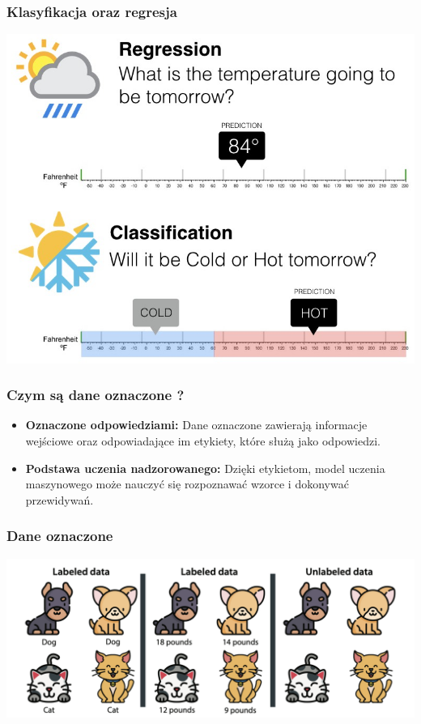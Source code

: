\documentclass[smaller]{beamer}
\begin{document}

\begin{frame}
\frametitle{Klasyfikacja oraz regresja}
\includegraphics[width=\textwidth,height=0.8\textheight,keepaspectratio]{../manifest/regression-classification-2.png}
\end{frame}


\begin{frame}
\frametitle{Czym są dane oznaczone ?}

\begin{itemize}
    \item \textbf{Oznaczone odpowiedziami:} Dane oznaczone zawierają informacje wejściowe oraz odpowiadające im etykiety, które służą jako odpowiedzi.
    \item \textbf{Podstawa uczenia nadzorowanego:} Dzięki etykietom, model uczenia maszynowego może nauczyć się rozpoznawać wzorce i dokonywać przewidywań.
\end{itemize}

\end{frame}


\begin{frame}
\frametitle{Dane oznaczone}
\includegraphics[width=\textwidth,height=0.8\textheight,keepaspectratio]{../manifest/labelled-data.png}
\end{frame}
\end{document}
